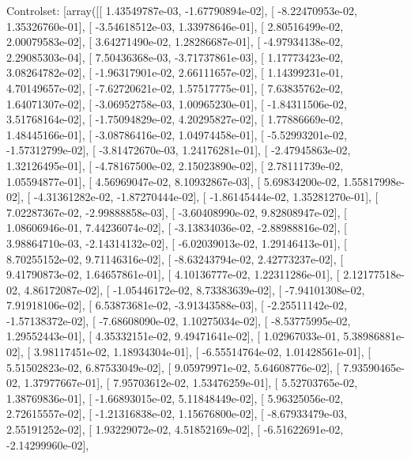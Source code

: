 \documentclass{article}
\begin{document}
Controlset: [array([[  1.43549787e-03,  -1.67790894e-02],
       [ -8.22470953e-02,   1.35326760e-01],
       [ -3.54618512e-03,   1.33978646e-01],
       [  2.80516499e-02,   2.00079583e-02],
       [  3.64271490e-02,   1.28286687e-01],
       [ -4.97934138e-02,   2.29085303e-04],
       [  7.50436368e-03,  -3.71737861e-03],
       [  1.17773423e-02,   3.08264782e-02],
       [ -1.96317901e-02,   2.66111657e-02],
       [  1.14399231e-01,   4.70149657e-02],
       [ -7.62720621e-02,   1.57517775e-01],
       [  7.63835762e-02,   1.64071307e-02],
       [ -3.06952758e-03,   1.00965230e-01],
       [ -1.84311506e-02,   3.51768164e-02],
       [ -1.75094829e-02,   4.20295827e-02],
       [  1.77886669e-02,   1.48445166e-01],
       [ -3.08786416e-02,   1.04974458e-01],
       [ -5.52993201e-02,  -1.57312799e-02],
       [ -3.81472670e-03,   1.24176281e-01],
       [ -2.47945863e-02,   1.32126495e-01],
       [ -4.78167500e-02,   2.15023890e-02],
       [  2.78111739e-02,   1.05594877e-01],
       [  4.56969047e-02,   8.10932867e-03],
       [  5.69834200e-02,   1.55817998e-02],
       [ -4.31361282e-02,  -1.87270444e-02],
       [ -1.86145444e-02,   1.35281270e-01],
       [  7.02287367e-02,  -2.99888858e-03],
       [ -3.60408990e-02,   9.82808947e-02],
       [  1.08606946e-01,   7.44236074e-02],
       [ -3.13834036e-02,  -2.88988816e-02],
       [  3.98864710e-03,  -2.14314132e-02],
       [ -6.02039013e-02,   1.29146413e-01],
       [  8.70255152e-02,   9.71146316e-02],
       [ -8.63243794e-02,   2.42773237e-02],
       [  9.41790873e-02,   1.64657861e-01],
       [  4.10136777e-02,   1.22311286e-01],
       [  2.12177518e-02,   4.86172087e-02],
       [ -1.05446172e-02,   8.73383639e-02],
       [ -7.94101308e-02,   7.91918106e-02],
       [  6.53873681e-02,  -3.91343588e-03],
       [ -2.25511142e-02,  -1.57138372e-02],
       [ -7.68608090e-02,   1.10275034e-02],
       [ -8.53775995e-02,   1.29552443e-01],
       [  4.35332151e-02,   9.49471641e-02],
       [  1.02967033e-01,   5.38986881e-02],
       [  3.98117451e-02,   1.18934304e-01],
       [ -6.55514764e-02,   1.01428561e-01],
       [  5.51502823e-02,   6.87533049e-02],
       [  9.05979971e-02,   5.64608776e-02],
       [  7.93590465e-02,   1.37977667e-01],
       [  7.95703612e-02,   1.53476259e-01],
       [  5.52703765e-02,   1.38769836e-01],
       [ -1.66893015e-02,   5.11848449e-02],
       [  5.96325056e-02,   2.72615557e-02],
       [ -1.21316838e-02,   1.15676800e-02],
       [ -8.67933479e-03,   2.55191252e-02],
       [  1.93229072e-02,   4.51852169e-02],
       [ -6.51622691e-02,  -2.14299960e-02],
\end{document}
